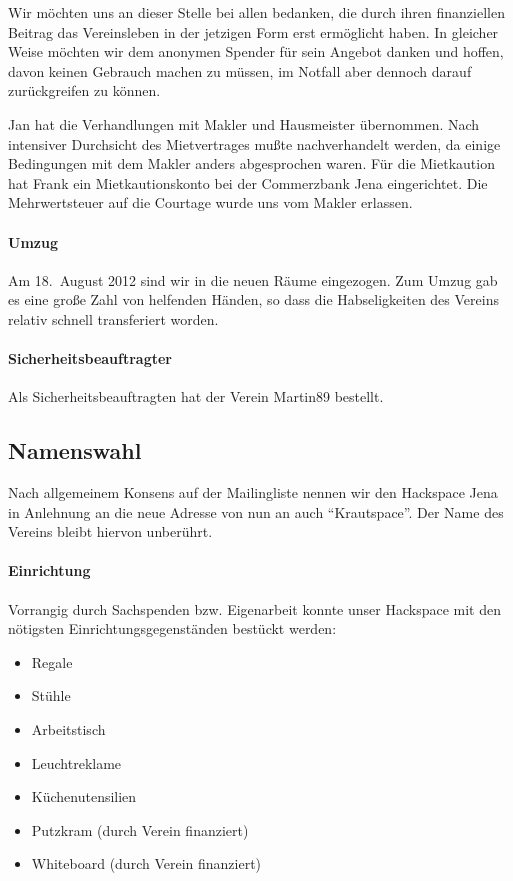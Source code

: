 \documentclass[10pt,DIV16]{scrartcl}
\begin{document}
Wir möchten uns an dieser Stelle bei allen bedanken, die durch ihren
finanziellen Beitrag das Vereinsleben in der jetzigen Form erst ermöglicht
haben.  In gleicher Weise möchten wir dem anonymen Spender für sein Angebot
danken und hoffen, davon keinen Gebrauch machen zu müssen, im Notfall aber
dennoch darauf zurückgreifen zu können.

Jan hat die Verhandlungen mit Makler und Hausmeister übernommen.  Nach
intensiver Durchsicht des Mietvertrages mußte nachverhandelt werden, da einige
Bedingungen mit dem Makler anders abgesprochen waren.  Für die Mietkaution hat
Frank ein Mietkautionskonto bei der Commerzbank Jena eingerichtet.  Die
Mehrwertsteuer auf die Courtage wurde uns vom Makler erlassen.

\paragraph{Umzug}

Am 18.~August 2012 sind wir in die neuen Räume eingezogen. Zum Umzug
gab es eine große Zahl von helfenden Händen, so dass die
Habseligkeiten des Vereins relativ schnell transferiert worden.

\paragraph{Sicherheitsbeauftragter}

Als Sicherheitsbeauftragten hat der Verein Martin89 bestellt.

\subsection{Namenswahl}

Nach allgemeinem Konsens auf der Mailingliste nennen wir den Hackspace Jena in
Anlehnung an die neue Adresse von nun an auch "`Krautspace"'.  Der Name des
Vereins bleibt hiervon unberührt.

\paragraph{Einrichtung}

Vorrangig durch Sachspenden bzw. Eigenarbeit konnte unser Hackspace mit den
nötigsten Einrichtungsgegenständen bestückt werden:
\begin{itemize}
	\item Regale
	\item Stühle
	\item Arbeitstisch
	\item Leuchtreklame
	\item Küchenutensilien
	\item Putzkram (durch Verein finanziert)
	\item Whiteboard  (durch Verein finanziert)
\end{itemize}
\end{document}

